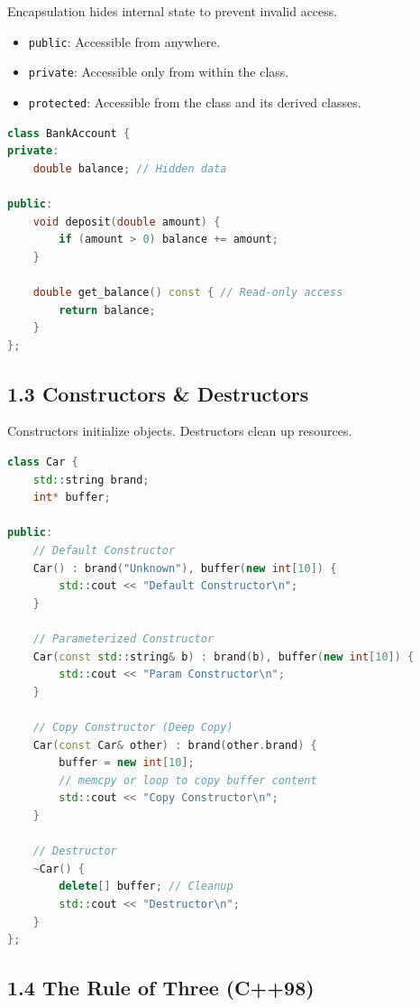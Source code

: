 Encapsulation hides internal state to prevent invalid access.

\begin{itemize}
\tightlist
\item
  \passthrough{\lstinline!public!}: Accessible from anywhere.
\item
  \passthrough{\lstinline!private!}: Accessible only from within the
  class.
\item
  \passthrough{\lstinline!protected!}: Accessible from the class and its
  derived classes.
\end{itemize}

\begin{lstlisting}[language={C++}]
class BankAccount {
private:
    double balance; // Hidden data

public:
    void deposit(double amount) {
        if (amount > 0) balance += amount;
    }
    
    double get_balance() const { // Read-only access
        return balance;
    }
};
\end{lstlisting}

\hypertarget{constructors-destructors}{%
\subsection{1.3 Constructors \&
Destructors}\label{constructors-destructors}}

Constructors initialize objects. Destructors clean up resources.

\begin{lstlisting}[language={C++}]
class Car {
    std::string brand;
    int* buffer;

public:
    // Default Constructor
    Car() : brand("Unknown"), buffer(new int[10]) {
        std::cout << "Default Constructor\n";
    }

    // Parameterized Constructor
    Car(const std::string& b) : brand(b), buffer(new int[10]) {
        std::cout << "Param Constructor\n";
    }

    // Copy Constructor (Deep Copy)
    Car(const Car& other) : brand(other.brand) {
        buffer = new int[10];
        // memcpy or loop to copy buffer content
        std::cout << "Copy Constructor\n";
    }

    // Destructor
    ~Car() {
        delete[] buffer; // Cleanup
        std::cout << "Destructor\n";
    }
};
\end{lstlisting}

\hypertarget{the-rule-of-three-c98}{%
\subsection{1.4 The Rule of Three (C++98)}\label{the-rule-of-three-c98}}

